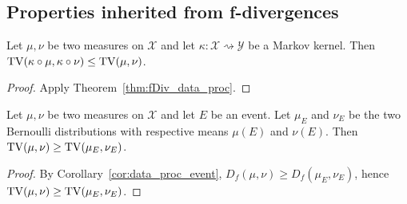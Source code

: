 \subsection{Properties inherited from f-divergences}

\begin{theorem}
  \label{thm:tv_data_proc}
  Let $\mu, \nu$ be two measures on $\mathcal X$ and let $\kappa : \mathcal X \rightsquigarrow \mathcal Y$ be a Markov kernel.
  Then $\operatorname{TV}(\kappa \circ \mu, \kappa \circ \nu) \le \operatorname{TV}(\mu, \nu)$.
\end{theorem}

\begin{proof}
Apply Theorem~\ref{thm:fDiv_data_proc}.
\end{proof}

\begin{lemma}
  \label{lem:tv_data_proc_event}
  Let $\mu, \nu$ be two measures on $\mathcal X$ and let $E$ be an event. Let $\mu_E$ and $\nu_E$ be the two Bernoulli distributions with respective means $\mu(E)$ and $\nu(E)$.
  Then $\operatorname{TV}(\mu, \nu) \ge \operatorname{TV}(\mu_E, \nu_E)$.
\end{lemma}

\begin{proof}
By Corollary~\ref{cor:data_proc_event}, $D_f(\mu, \nu) \ge D_f(\mu_E, \nu_E)$, hence $\operatorname{TV}(\mu, \nu) \ge \operatorname{TV}(\mu_E, \nu_E)$.
\end{proof}
